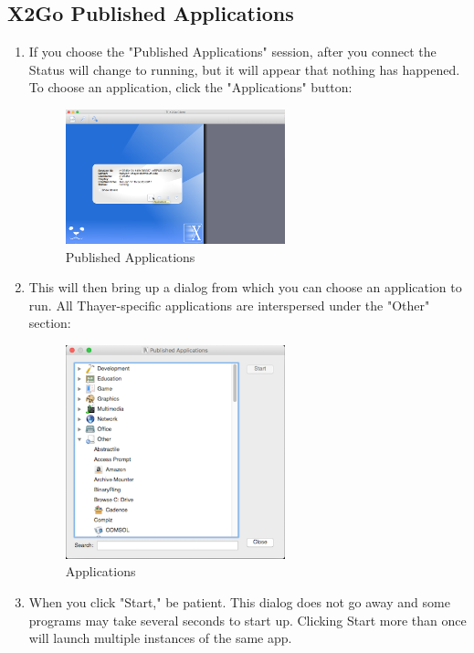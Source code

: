 \subsection{X2Go Published Applications}
\begin{enumerate}[resume]
	\item If you choose the "Published Applications" session, after you connect the Status will change to running, but it will appear that nothing has happened. To choose an application, click the "Applications" button: 
\begin{figure}[!htb]
	\centering
	\includegraphics[width=0.6\textwidth]{src/images/image11.png}
	\caption{Published Applications}
	\label{fig:fig11}
\end{figure}
	\item This will then bring up a dialog from which you can choose an application to run. All Thayer-specific applications are interspersed under the "Other" section:
\begin{figure}[!htb]
	\centering
	\includegraphics[width=0.6\textwidth]{src/images/image12.png}
	\caption{Applications}
	\label{fig:fig12}
\end{figure}
	\item When you click "Start," be patient. This dialog does not go away and some programs may take several seconds to start up. Clicking Start more than once will launch multiple instances of the same app. 

\end{enumerate}
